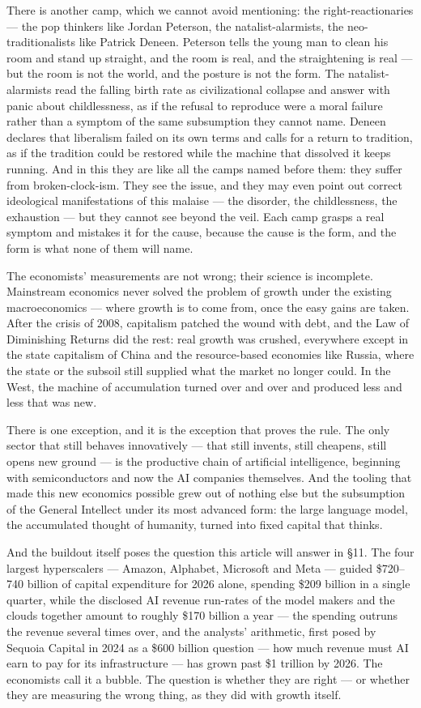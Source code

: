 \documentclass[11pt]{article}
\begin{document}
There is another camp, which we cannot avoid mentioning: the
right-reactionaries --- the pop thinkers like Jordan Peterson, the
natalist-alarmists, the neo-traditionalists like Patrick Deneen.
Peterson tells the young man to clean his room and stand up straight,
and the room is real, and the straightening is real --- but the room is
not the world, and the posture is not the form. The natalist-alarmists
read the falling birth rate as civilizational collapse and answer with
panic about childlessness, as if the refusal to reproduce were a moral
failure rather than a symptom of the same subsumption they cannot name.
Deneen declares that liberalism failed on its own terms and calls for a
return to tradition, as if the tradition could be restored while the
machine that dissolved it keeps running. And in this they are like all
the camps named before them: they suffer from broken-clock-ism. They
see the issue, and they may even point out correct ideological
manifestations of this malaise --- the disorder, the childlessness, the
exhaustion --- but they cannot see beyond the veil. Each camp grasps a
real symptom and mistakes it for the cause, because the cause is the
form, and the form is what none of them will name.

The economists' measurements are not wrong; their science is
incomplete. Mainstream economics never solved the problem of growth
under the existing macroeconomics --- where growth is to come from, once
the easy gains are taken. After the crisis of 2008, capitalism patched
the wound with debt, and the Law of Diminishing Returns did the rest:
real growth was crushed, everywhere except in the state capitalism of
China and the resource-based economies like Russia, where the state or
the subsoil still supplied what the market no longer could. In the West,
the machine of accumulation turned over and over and produced less and
less that was new.

There is one exception, and it is the exception that proves the rule.
The only sector that still behaves innovatively --- that still invents,
still cheapens, still opens new ground --- is the productive chain of
artificial intelligence, beginning with semiconductors and now the AI
companies themselves. And the tooling that made this new economics
possible grew out of nothing else but the subsumption of the General
Intellect under its most advanced form: the large language model, the
accumulated thought of humanity, turned into fixed capital that thinks.

And the buildout itself poses the question this article will answer in
\S 11. The four largest hyperscalers --- Amazon, Alphabet, Microsoft
and Meta --- guided \$720--740 billion of capital expenditure for 2026
alone, spending \$209 billion in a single quarter, while the disclosed
AI revenue run-rates of the model makers and the clouds together amount
to roughly \$170 billion a year --- the spending outruns the revenue
several times over, and the analysts' arithmetic, first posed by
Sequoia Capital in 2024 as a \$600 billion question --- how much
revenue must AI earn to pay for its infrastructure --- has grown past
\$1 trillion by 2026. The economists call it a bubble. The question is
whether they are right --- or whether they are measuring the wrong
thing, as they did with growth itself.
\end{document}
